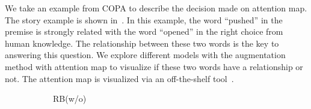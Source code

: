 We take an example from COPA to describe the decision made on 
attention map. The story example is shown in~.
In this example, the word ``pushed'' in the premise is strongly
related with the word ``opened'' in the right choice from human knowledge. 
The relationship between these two words is the key to answering this question. 
We explore different models with the augmentation method with attention map 
to visualize if these two words have a relationship or not.
The attention map is visualized via an off-the-shelf tool~\cite{vig-2019-multiscale}.
\begin{figure}[th!]
\centering
\begin{subfigure}[b]{0.20\textwidth}
\centering

\caption{RB(w/o)}
\label{fig:case_original}
\end{subfigure}
\hfill
\begin{subfigure}[b]{0.20\textwidth}
\centering

\end{subfigure}
\end{figure}
